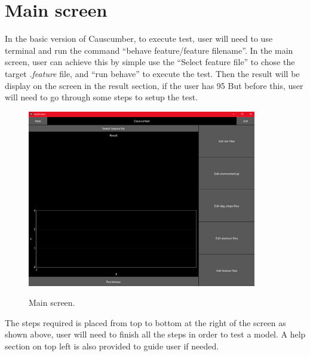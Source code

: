 \section{Main screen}
In the basic version of Causcumber, to execute test, user will need to use terminal and run the command “behave feature/{feature filename}”. In the main screen, user can achieve this by simple use the “Select feature file” to chose the target \textsl{.feature} file, and “run behave” to execute the test. Then the result will be display on the screen in the result section, if the user has 95%
But before this, user will need to go through some steps to setup the test.
\begin{figure}[H]
	\centering
	\includegraphics[width=10cm]{figures/mainScreen.png}\\
	\caption{Main screen.}
	\label{fig:figure12}
\end{figure}
The steps required is placed from top to bottom at the right of the screen as shown above, user will need to finish all the steps in order to test a model. A help section on top left is also provided to guide user if needed.



